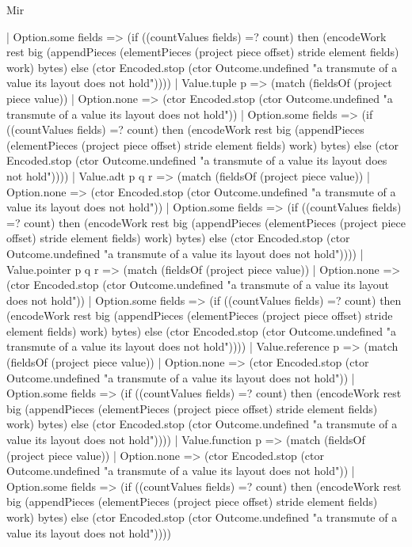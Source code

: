 \begin{lexlean}{Mir}
\begin{semanticmodule}
{            | Option.some fields => (if ((countValues fields) =? count) then (encodeWork rest big (appendPieces (elementPieces (project piece offset) stride element fields) work) bytes) else (ctor Encoded.stop (ctor Outcome.undefined "a transmute of a value its layout does not hold"))))
          | Value.tuple p => (match (fieldsOf (project piece value))
            | Option.none => (ctor Encoded.stop (ctor Outcome.undefined "a transmute of a value its layout does not hold"))
            | Option.some fields => (if ((countValues fields) =? count) then (encodeWork rest big (appendPieces (elementPieces (project piece offset) stride element fields) work) bytes) else (ctor Encoded.stop (ctor Outcome.undefined "a transmute of a value its layout does not hold"))))
          | Value.adt p q r => (match (fieldsOf (project piece value))
            | Option.none => (ctor Encoded.stop (ctor Outcome.undefined "a transmute of a value its layout does not hold"))
            | Option.some fields => (if ((countValues fields) =? count) then (encodeWork rest big (appendPieces (elementPieces (project piece offset) stride element fields) work) bytes) else (ctor Encoded.stop (ctor Outcome.undefined "a transmute of a value its layout does not hold"))))
          | Value.pointer p q r => (match (fieldsOf (project piece value))
            | Option.none => (ctor Encoded.stop (ctor Outcome.undefined "a transmute of a value its layout does not hold"))
            | Option.some fields => (if ((countValues fields) =? count) then (encodeWork rest big (appendPieces (elementPieces (project piece offset) stride element fields) work) bytes) else (ctor Encoded.stop (ctor Outcome.undefined "a transmute of a value its layout does not hold"))))
          | Value.reference p => (match (fieldsOf (project piece value))
            | Option.none => (ctor Encoded.stop (ctor Outcome.undefined "a transmute of a value its layout does not hold"))
            | Option.some fields => (if ((countValues fields) =? count) then (encodeWork rest big (appendPieces (elementPieces (project piece offset) stride element fields) work) bytes) else (ctor Encoded.stop (ctor Outcome.undefined "a transmute of a value its layout does not hold"))))
          | Value.function p => (match (fieldsOf (project piece value))
            | Option.none => (ctor Encoded.stop (ctor Outcome.undefined "a transmute of a value its layout does not hold"))
            | Option.some fields => (if ((countValues fields) =? count) then (encodeWork rest big (appendPieces (elementPieces (project piece offset) stride element fields) work) bytes) else (ctor Encoded.stop (ctor Outcome.undefined "a transmute of a value its layout does not hold"))))
}
\end{semanticmodule}
\end{lexlean}
